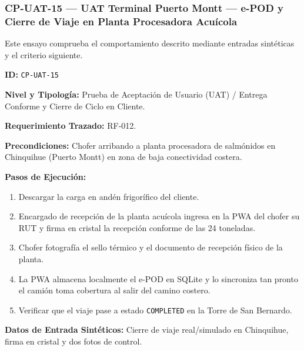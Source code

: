 \subsubsection*{CP-UAT-15 — UAT Terminal Puerto Montt — e-POD y Cierre de Viaje en Planta Procesadora Acuícola}\label{sec:9-cp-uat-15}
Este ensayo comprueba el comportamiento descrito mediante entradas sintéticas y el criterio siguiente.

\par\noindent\textbf{ID:} \texttt{C\allowbreak{}P\allowbreak{}-\allowbreak{}U\allowbreak{}A\allowbreak{}T\allowbreak{}-\allowbreak{}1\allowbreak{}5\allowbreak{}}\par
\par\noindent\textbf{Nivel y Tipología:} Prueba de Aceptación de Usuario (UAT) / Entrega Conforme y Cierre de Ciclo en Cliente.\par
\par\noindent\textbf{Requerimiento Trazado:} RF-012.\par
\par\noindent\textbf{Precondiciones:} Chofer arribando a planta procesadora de salmónidos en Chinquihue (Puerto Montt) en zona de baja conectividad costera.\par
\par\noindent\textbf{Pasos de Ejecución:} \par
\begin{enumerate}
\item Descargar la carga en andén frigorífico del cliente.
\item Encargado de recepción de la planta acuícola ingresa en la PWA del chofer su RUT y firma en cristal la recepción conforme de las 24 toneladas.
\item Chofer fotografía el sello térmico y el documento de recepción físico de la planta.
\item La PWA almacena localmente el e-POD en SQLite y lo sincroniza tan pronto el camión toma cobertura al salir del camino costero.
\item Verificar que el viaje pase a estado \texttt{C\allowbreak{}O\allowbreak{}M\allowbreak{}P\allowbreak{}L\allowbreak{}E\allowbreak{}T\allowbreak{}E\allowbreak{}D\allowbreak{}} en la Torre de San Bernardo.
\end{enumerate}
\par\noindent\textbf{Datos de Entrada Sintéticos:} Cierre de viaje real/simulado en Chinquihue, firma en cristal y dos fotos de control.\par
